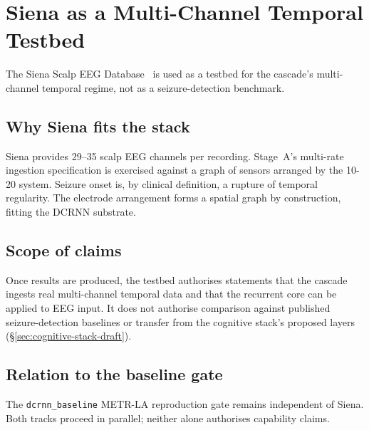 \section{Siena as a Multi-Channel Temporal Testbed}
\label{sec:siena-testbed}

The Siena Scalp EEG Database~\citep{siena2020physionet} is used as a
testbed for the cascade's multi-channel temporal regime, not as a
seizure-detection benchmark.

\subsection{Why Siena fits the stack}

Siena provides 29--35 scalp EEG channels per recording. Stage~A's
multi-rate ingestion specification is exercised against a graph of
sensors arranged by the 10-20 system. Seizure onset is, by clinical
definition, a rupture of temporal regularity. The electrode arrangement
forms a spatial graph by construction, fitting the DCRNN substrate.

\subsection{Scope of claims}

Once results are produced, the testbed authorises statements that the
cascade ingests real multi-channel temporal data and that the recurrent
core can be applied to EEG input. It does not authorise comparison
against published seizure-detection baselines or transfer from the
cognitive stack's proposed layers (\S\ref{sec:cognitive-stack-draft}).

\subsection{Relation to the baseline gate}

The \texttt{dcrnn\_baseline} METR-LA reproduction gate remains
independent of Siena. Both tracks proceed in parallel; neither alone
authorises capability claims.

